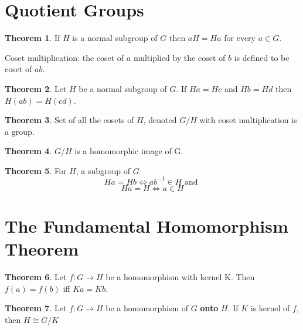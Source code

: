 \documentclass[a4paper,12pt]{article}
\theoremstyle{definition}
\theoremstyle{axiom}
\theoremstyle{theorem}
\newtheorem{theorem}{Theorem}[section]
\theoremstyle{lemma}
\begin{document}
\section{Quotient Groups}
\begin{theorem}{}
    If $H$ is a normal subgroup of $G$ then $aH = Ha$ for every $a \in G$.
\end{theorem}
Coset multiplication: the coset of $a$ multiplied by the coset of $b$ is defined to be coset of $ab$.
\begin{theorem}{}
    Let $H$ be a normal subgroup of $G$. If $Ha = Hc$ and $Hb = Hd$ then $H(ab) = H(cd)$.
\end{theorem}
\begin{theorem}{}
    Set of all the cosets of $H$, denoted $G/H$ with coset multiplication is a group.
\end{theorem}
\begin{theorem}{}
    $G/H$ is a homomorphic image of G.
\end{theorem}
\begin{theorem}{}
        For $H$, a subgroup of $G$
        \begin{equation*}\tag{a}
            Ha = Hb \iff ab^{-1} \in H \text{ and }
        \end{equation*}
        \begin{equation*}\tag{b}
            Ha = H \iff a \in H
        \end{equation*}
\end{theorem}
\section{The Fundamental Homomorphism Theorem}
\begin{theorem}{}
    Let $f: G \to H$ be a homomorphism with kernel K. Then $f(a) = f(b)$ iff $Ka = Kb$.
\end{theorem}
\begin{theorem}{}
        Let $f: G \to H$ be a homomorphism of $G$ \textbf{onto} $H$. If $K$ is kernel of $f$, then
        $H \cong G/K$
\end{theorem}
\end{document}
